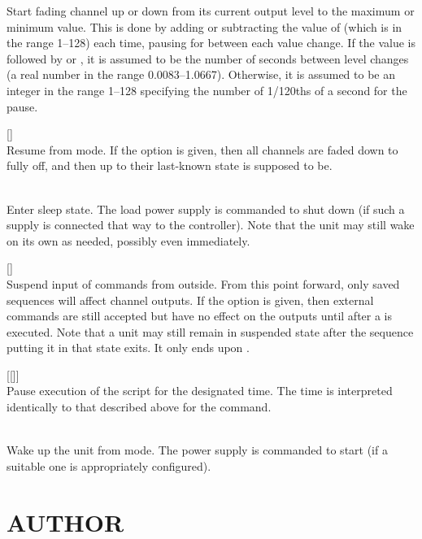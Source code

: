 \begin{list}{}{}
Start fading channel
up or down from its current output level to the maximum or minimum value.  This is done
by adding or subtracting the value of
(which is in the range 1--128) each time, pausing for
between each value change.  If the
value is followed by 
or
,
it is assumed to be the number of seconds between level changes (a real number
in the range 0.0083--1.0667). 
Otherwise, it is assumed to be an integer in the range 1--128 specifying the number
of 1/120ths of a second for the pause.  
\item[{\codetype{RESUME }[\codetype{WITH FADE}]}]\hfill\\
Resume from
mode.  If the
option is given, then all channels are faded down to fully off, and then up to
their last-known state is supposed to be.
\item[{\codetype{SLEEP}}]\hfill\\
Enter sleep state.  The load power supply is commanded to shut down (if such
a supply is connected that way to the controller).  Note that the unit may still
wake on its own as needed, possibly even immediately.
\item[{\codetype{SUSPEND }[\codetype{WITH UPDATE}]}]\hfill\\
Suspend input of commands from outside.  From this point forward, only saved
sequences will affect channel outputs.  If the
option is given, then external commands are still accepted but have no effect
on the outputs until after a
is executed.  Note that a unit may still remain in suspended state after the
sequence putting it in that state exits.  It only ends upon
.
\item[{\codetype{WAIT \Var*{t} }[\codetype{SEC}[\codetype{ONDS}]]}]\hfill\\
Pause execution of the script for the designated time.  The time
is interpreted identically to that described above for the
command.
\item[{\codetype{WAKE}}]\hfill\\
Wake up the unit from
mode.  The power supply is commanded to start (if a suitable one is appropriately
configured).
\end{list}
\section*{AUTHOR}


